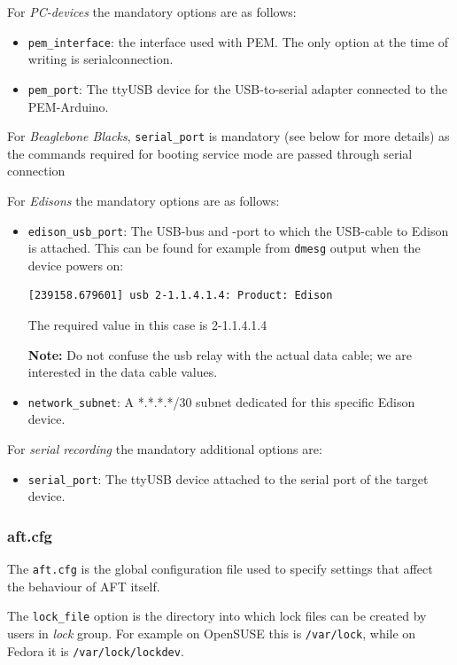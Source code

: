 \documentclass[a4paper,11pt]{article}
\newcommand{\note}{\textbf{Note: }}
\newcommand{\cmd}[1]{\texttt{#1}}
\begin{document}
For \emph{PC-devices} the mandatory options are as follows:
\begin{itemize}
\item \cmd{pem\_interface}: the interface used with PEM. The only option at the time of writing is serialconnection.
\item \cmd{pem\_port}: The ttyUSB device for the USB-to-serial adapter connected to the PEM-Arduino.
\end{itemize}

For \emph{Beaglebone Blacks}, \cmd{serial\_port} is mandatory (see below for more details) as the commands required for booting service mode are passed through serial connection

For \emph{Edisons} the mandatory options are as follows:
\begin{itemize}
\item \cmd{edison\_usb\_port}: The USB-bus and -port to which the USB-cable to Edison is attached. This can be found for example from \cmd{dmesg} output when the device powers on:

\begin{lstlisting}
[239158.679601] usb 2-1.1.4.1.4: Product: Edison
\end{lstlisting}

The required value in this case is 2-1.1.4.1.4

\note Do not confuse the usb relay with the actual data cable; we are interested in the data cable values.

\item \cmd{network\_subnet}: A *.*.*.*/30 subnet dedicated for this specific Edison device.
\end{itemize}

For \emph{serial recording} the mandatory additional options are:

\begin{itemize}
	\item \cmd{serial\_port}: The ttyUSB device attached to the serial port of the target device.
\end{itemize}

\subsubsection*{aft.cfg}
The \cmd{aft.cfg} is the global configuration file used to specify settings that affect the behaviour of AFT itself.

The \cmd{lock\_file} option is the directory into which lock files can be created by users in \emph{lock} group. For example on OpenSUSE this is \cmd{/var/lock}, while on Fedora it is \cmd{/var/lock/lockdev}.
\end{document}
